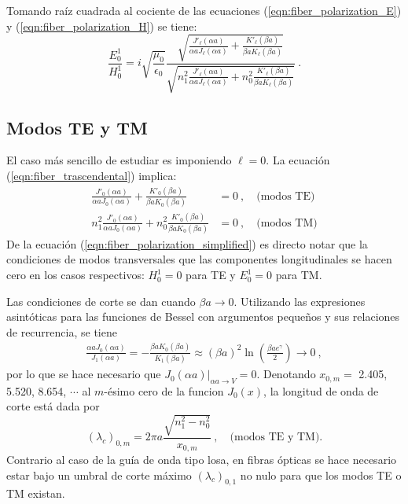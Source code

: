 Tomando raíz cuadrada al cociente de las ecuaciones (\ref{eqn:fiber_polarization_E}) y (\ref{eqn:fiber_polarization_H}) se tiene:
\begin{equation}
	\frac{E_0^1}{H_0^1} = i \sqrt{\frac{\mu_0}{\epsilon_0}} \frac{\sqrt{ \frac{J'_\ell(\alpha a)}{\alpha a J_\ell(\alpha a)} + \frac{K'_\ell(\beta a)}{\beta a K_\ell(\beta a)}}}{\sqrt{n_1^2 \frac{J'_\ell(\alpha a)}{\alpha a J_\ell(\alpha a)} + n_0^2 \frac{K'_\ell(\beta a)}{\beta a K_\ell(\beta a)}}} \ .
	\label{eqn:fiber_polarization_simplified}
\end{equation}
\subsection{Modos TE y TM}
El caso más sencillo de estudiar es imponiendo $\ell = 0$. La ecuación (\ref{eqn:fiber_trascendental}) implica:
\begin{align*}
	\frac{J'_{0}(\alpha a)}{\alpha a J_0(\alpha a)} + \frac{K'_0(\beta a)}{\beta a K_0(\beta a)}&=  0 \ , \quad \text{(modos TE)}
	\\
	n_1^2\frac{J'_{0}(\alpha a)}{\alpha a J_0(\alpha a)} + n_0^2 \frac{K'_0(\beta a)}{\beta a K_0(\beta a)} &= 0 \ , \quad \text{(modos TM)}
\end{align*}
De la ecuación (\ref{eqn:fiber_polarization_simplified}) es directo notar que la condiciones de modos transversales que las componentes longitudinales se hacen cero en los casos respectivos: $H_0^1 = 0$ para TE y $E_0^1 = 0$ para TM.

Las condiciones de corte se dan cuando $\beta a \to 0$. Utilizando las expresiones asintóticas para las funciones de Bessel con argumentos pequeños y sus relaciones de recurrencia, se tiene
\begin{align*}
	\frac{\alpha a J_0(\alpha a)}{J_1(\alpha a)}  = -\frac{\beta a K_{0}(\beta a)} {K_1(\beta a)} \approx (\beta a)^2\ln\left(\frac{\beta a e^\gamma}{2}\right) \to 0 \ ,
\end{align*}
por lo que se hace necesario que $\left. J_0(\alpha a)\right|_{\alpha a \to V} = 0$. Denotando $x_{0,m}=$ 2.405,  5.520,  8.654, $\cdots$ al $m$-ésimo cero de la funcion $J_0(x)$, la longitud de onda de corte está dada por 
\begin{equation}
(\lambda_c)_{0,m} = 2\pi a \frac{\sqrt{n_1^2 - n_0^2}}{x_{0,m}} \ , \quad\text{(modos TE y TM).}
\end{equation} 
Contrario al caso de la guía de onda tipo losa, en fibras ópticas se hace necesario estar bajo un umbral de corte máximo $(\lambda_c)_{0,1}$ no nulo para que los modos TE o TM existan.

